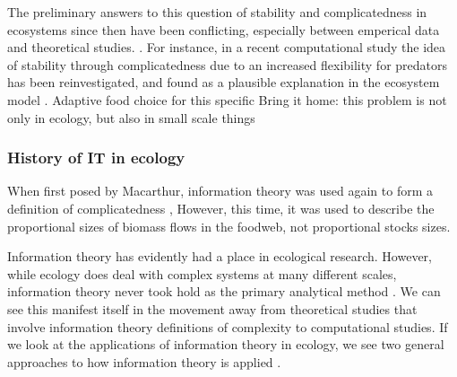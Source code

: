 \documentclass[../main.tex]{subfiles}
\begin{document}
The preliminary answers to this question of stability and complicatedness in ecosystems since then have been conflicting, especially between emperical data and theoretical studies. \cite{pimm1984complexity}.
For instance, in a recent computational study the idea of stability through complicatedness due to an increased flexibility for predators has been reinvestigated, and found as a plausible explanation in the ecosystem model \cite{kondoh2003foraging}.
Adaptive food choice for this specific
Bring it home: this problem is not only in ecology, but also in small scale things



\subsubsection{History of IT in ecology}

When first posed by Macarthur, information theory was used again to form a definition of complicatedness \cite{macarthur1955fluctuations},
However, this time, it was used to describe the proportional sizes of biomass flows in the foodweb, not proportional stocks sizes.




Information theory has evidently had a place in ecological research.
However, while ecology does deal with complex systems at many different scales, information theory never took hold as the primary analytical method \cite{ulanowicz2001information}. %
We can see this manifest itself in the movement away from theoretical studies that involve information theory definitions of complexity to computational studies.
If we look at the applications of information theory in ecology, we see two general approaches to how information theory is applied \cite{ulanowicz2001information}.
\end{document}
